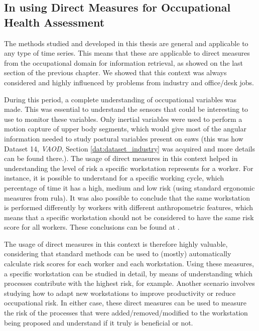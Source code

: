\subsection{In using Direct Measures for Occupational Health Assessment}

The methods studied and developed in this thesis are general and applicable to any type of time series. This means that these are applicable to direct measures from the occupational domain for information retrieval, as showed on the last section of the previous chapter. We showed that this context was always considered and highly influenced by problems from industry and office/desk jobs. 
\par
During this period, a complete understanding of occupational variables was made. This was essential to understand the sensors that could be interesting to use to monitor these variables. Only inertial variables were used to perform a motion capture of upper body segments, which would give most of the angular information needed to study postural variables present on \gls{eaws} (this was how Dataset 14, \textit{VAOD}, Section \ref{dat:dataset_industry} was acquired and more details can be found there.). The usage of direct measures in this context helped in understanding the level of risk a specific workstation represents for a worker. For instance, it is possible to understand for a specific working cycle, which percentage of time it has a high, medium and low risk (using standard ergonomic measures from \gls{rula}). It was also possible to conclude that the same workstation is performed differently by workers with different anthropometric features, which means that a specific workstation should not be considered to have the same risk score for all workers. These conclusions can be found at \cite{sara}.
\par
The usage of direct measures in this context is therefore highly valuable, considering that standard methods can be used to (mostly) automatically calculate risk scores for each worker and each workstation. Using these measures, a specific workstation can be studied in detail, by means of understanding which processes contribute with the highest risk, for example. Another scenario involves studying how to adapt new workstations to improve productivity or reduce occupational risk. In either case, these direct measures can be used to measure the risk of the processes that were added/removed/modified to the workstation being proposed and understand if it truly is beneficial or not.
\par
